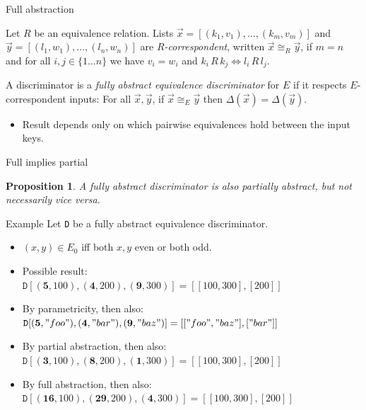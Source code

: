 \documentclass{beamer}
\newtheorem{proposition}[theorem]{Proposition}
\begin{document}
\begin{frame}{Full abstraction}
  \begin{definition}[$R$-correspondence]
    Let $R$ be an equivalence relation. Lists
    $\vec{x} = [(k_1, v_1), \ldots, (k_m, v_m)]$ and
    $\vec{y} = [(l_1, w_1), \ldots, (l_n, w_n)]$ are
    \emph{$R$-correspondent}, written $\vec{x} \cong_R \vec{y}$, if $m = n$
    and for all $i, j \in \{1 \ldots n\}$ we have $v_i = w_i$ and
    $k_i\,R\,k_j \Leftrightarrow l_i\,R\,l_j$.
  \end{definition}
  \begin{definition}
    A discriminator is a \emph{fully abstract equivalence discriminator} for
    $E$ if it respects $E$-correspondent inputs: For all $\vec{x}, \vec{y}$,
    if $\vec{x} \cong_E \vec{y}$ then $\Delta(\vec{x}) = \Delta(\vec{y})$.
  \end{definition}
  \begin{itemize}
  \item Result depends only on which pairwise equivalences hold between the
    input keys.
  \end{itemize}
\end{frame}

\begin{frame}{Full implies partial}
  \begin{proposition}
    A fully abstract discriminator is also partially abstract, but not
    necessarily vice versa.
  \end{proposition}
\end{frame}

\begin{frame}{Example}
  Let \texttt{D} be a fully abstract equivalence discriminator.
  \begin{itemize}
  \item $(x, y) \in E_0$ iff both $x, y$ even or both odd.
  \item Possible result:\\
    $\texttt{D}[(\mathbf{5}, 100), (\mathbf{4}, 200), (\mathbf{9}, 300)]
    = [[100, 300], [200]]$
  \item By parametricity, then also:\\
    $\texttt{D}[(\mathbf{5}, "foo"), (\mathbf{4}, "bar"),
    (\mathbf{9}, "baz")] = [["foo", "baz"], ["bar"]]$
  \item By partial abstraction, then also:\\
    $\texttt{D}[(\mathbf{3}, 100), (\mathbf{8}, 200), (\mathbf{1}, 300)]
    = [[100, 300], [200]]$
  \item By full abstraction, then also:\\
    $\texttt{D}[(\mathbf{16}, 100), (\mathbf{29}, 200), (\mathbf{4}, 300)]
    = [[100, 300], [200]]$
  \end{itemize}
\end{frame}
\end{document}
